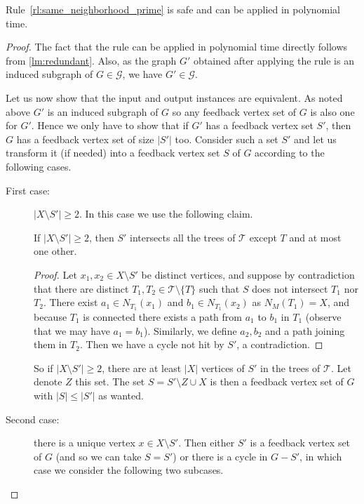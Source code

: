 \documentclass{amsart}
\newcommand{\G}{\mathcal{G}}
\newcommand{\T}{\mathcal{T}}
\newcommand{\ruleref}[1]{\hyperref[#1]{\ref*{#1}}}
\begin{document}
\begin{lemma}
    Rule~\ruleref{rl:same_neighborhood_prime} is safe and can be applied in polynomial time.
\end{lemma}

\begin{proof}
The fact that the rule can be applied in polynomial time directly follows from \autoref{lm:redundant}.
Also, as the graph $G'$ obtained after applying the rule is an induced subgraph of $G\in \G$, we have $G'\in \G$.


Let us now show that the input and output instances are equivalent.
As noted above $G'$ is an induced subgraph of $G$ so any feedback vertex set of $G$ is also one for $G'$.
Hence we only have to show that if $G'$ has a feedback vertex set $S'$, then $G$ has a feedback vertex set of size $|S'|$ too. Consider such a set $S'$ and let us transform it (if needed) into a feedback vertex set $S$ of $G$ according to the following cases.

\begin{description}
    \item[First case:] $|X\setminus S'|\geq 2$. In this case we use the following claim.
\begin{claim}
    If $|X\setminus S'|\geq 2$, then $S'$ intersects all the trees of $\T$ except $T$ and at most one other.
\end{claim}
\begin{proof}
Let $x_1,x_2\in X\setminus S'$ be distinct vertices, and suppose by contradiction that there are distinct $T_1,T_2\in \T\setminus \{T\}$ such that $S$ does not intersect $T_1$ nor $T_2$. There exist $a_1\in N_{T_1}(x_1)$ and $b_1\in N_{T_1}(x_2)$ as $N_M(T_1)=X$, and because $T_1$ is connected there exists a path from $a_1$ to $b_1$ in $T_1$ (observe that we may have $a_1=b_1$). Similarly, we define $a_2, b_2$ and a path joining them in $T_2$. Then we have a cycle not hit by $S'$, a contradiction.
\end{proof}

So if $|X\setminus S'|\geq 2$, there are at least $|X|$ vertices of $S'$ in the trees of $\T$. Let denote $Z$ this set. The set $S=S'\setminus Z \cup X$ is then a feedback vertex set of $G$ with $|S|\leq |S'|$ as wanted.

\item[Second case:] there is a unique vertex $x\in X\setminus S'$. Then either $S'$ is a feedback vertex set of $G$ (and so we can take $S=S'$) or there is a cycle in $G-S'$, in which case we consider the following two subcases.


\end{description}
\end{proof}
\end{document}
